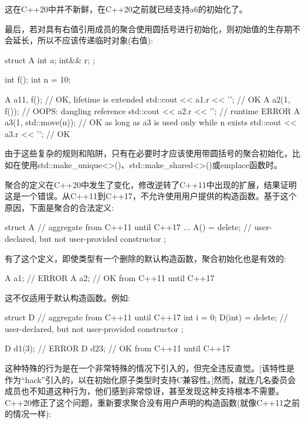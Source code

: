 这在C++20中并不新鲜，在C++20之前就已经支持a6的初始化了。

最后，若对具有右值引用成员的聚合使用圆括号进行初始化，则初始值的生存期不会延长，所以不应该传递临时对象(右值):

\begin{cpp}
struct A {
	int a;
	int&& r;
};

int f();
int n = 10;

A a1{1, f()}; // OK, lifetime is extended
std::cout << a1.r << '\n'; // OK
A a2(1, f()); // OOPS: dangling reference
std::cout << a2.r << '\n'; // runtime ERROR
A a3(1, std::move(n)); // OK as long as a3 is used only while n exists
std::cout << a3.r << '\n'; // OK
\end{cpp}

由于这些复杂的规则和陷阱，只有在必要时才应该使用带圆括号的聚合初始化，比如在使用std::make\_unique<>()、std::make\_shared<>()或emplace函数时。


聚合的定义在C++20中发生了变化，修改逆转了C++11中出现的扩展，结果证明这是一个错误。从C++11到C++17，不允许使用用户提供的构造函数。基于这个原因，下面是聚合的合法定义:

\begin{cpp}
struct A { // aggregate from C++11 until C++17
	...
	A() = delete; // user-declared, but not user-provided constructor
};
\end{cpp}

有了这个定义，即使类型有一个删除的默认构造函数，聚合初始化也是有效的:

\begin{cpp}
A a1; // ERROR
A a2{}; // OK from C++11 until C++17
\end{cpp}

这不仅适用于默认构造函数。例如:

\begin{cpp}
struct D { // aggregate from C++11 until C++17
	int i = 0;
	D(int) = delete; // user-declared, but not user-provided constructor
};

D d1(3); // ERROR
D d2{3}; // OK from C++11 until C++17
\end{cpp}

这种特殊的行为是在一个非常特殊的情况下引入的，但完全违反直觉。[该特性是作为“hack”引入的，以在初始化原子类型时支持C兼容性。]然而，就连几名委员会成员也不知道这种行为，他们感到非常惊讶，甚至发现这种支持根本不需要。C++20修正了这个问题，重新要求聚合没有用户声明的构造函数(就像C++11之前的情况一样):

